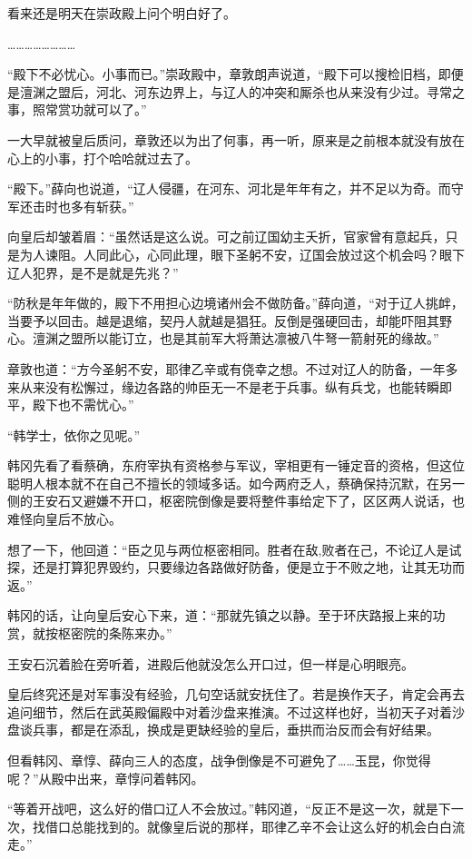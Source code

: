 看来还是明天在崇政殿上问个明白好了。 

…………………… 

“殿下不必忧心。小事而已。”崇政殿中，章敦朗声说道，“殿下可以搜检旧档，即便是澶渊之盟后，河北、河东边界上，与辽人的冲突和厮杀也从来没有少过。寻常之事，照常赏功就可以了。” 

一大早就被皇后质问，章敦还以为出了何事，再一听，原来是之前根本就没有放在心上的小事，打个哈哈就过去了。 

“殿下。”薛向也说道，“辽人侵疆，在河东、河北是年年有之，并不足以为奇。而守军还击时也多有斩获。” 

向皇后却皱着眉：“虽然话是这么说。可之前辽国幼主夭折，官家曾有意起兵，只是为人谏阻。人同此心，心同此理，眼下圣躬不安，辽国会放过这个机会吗？眼下辽人犯界，是不是就是先兆？” 

“防秋是年年做的，殿下不用担心边境诸州会不做防备。”薛向道，“对于辽人挑衅，当要予以回击。越是退缩，契丹人就越是猖狂。反倒是强硬回击，却能吓阻其野心。澶渊之盟所以能订立，也是其前军大将萧达凛被八牛弩一箭射死的缘故。” 

章敦也道：“方今圣躬不安，耶律乙辛或有侥幸之想。不过对辽人的防备，一年多来从来没有松懈过，缘边各路的帅臣无一不是老于兵事。纵有兵戈，也能转瞬即平，殿下也不需忧心。” 

“韩学士，依你之见呢。” 

韩冈先看了看蔡确，东府宰执有资格参与军议，宰相更有一锤定音的资格，但这位聪明人根本就不在自己不擅长的领域多话。如今两府乏人，蔡确保持沉默，在另一侧的王安石又避嫌不开口，枢密院倒像是要将整件事给定下了，区区两人说话，也难怪向皇后不放心。 

想了一下，他回道：“臣之见与两位枢密相同。胜者在敌,败者在己，不论辽人是试探，还是打算犯界毁约，只要缘边各路做好防备，便是立于不败之地，让其无功而返。”

韩冈的话，让向皇后安心下来，道：“那就先镇之以静。至于环庆路报上来的功赏，就按枢密院的条陈来办。”

王安石沉着脸在旁听着，进殿后他就没怎么开口过，但一样是心明眼亮。

皇后终究还是对军事没有经验，几句空话就安抚住了。若是换作天子，肯定会再去追问细节，然后在武英殿偏殿中对着沙盘来推演。不过这样也好，当初天子对着沙盘谈兵事，都是在添乱，换成是更缺经验的皇后，垂拱而治反而会有好结果。

但看韩冈、章惇、薛向三人的态度，战争倒像是不可避免了……玉昆，你觉得呢？”从殿中出来，章惇问着韩冈。

“等着开战吧，这么好的借口辽人不会放过。”韩冈道，“反正不是这一次，就是下一次，找借口总能找到的。就像皇后说的那样，耶律乙辛不会让这么好的机会白白流走。”

